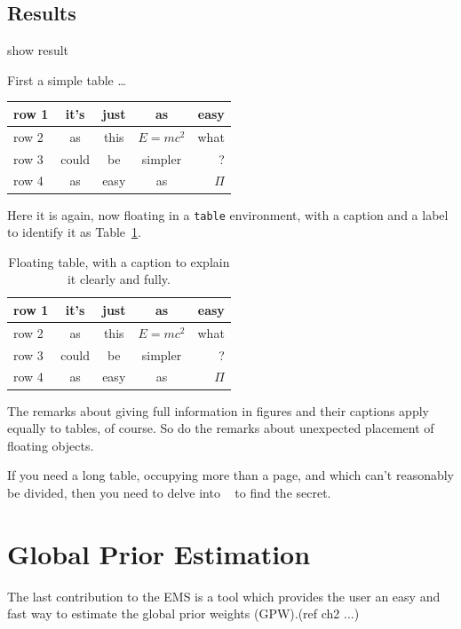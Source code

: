 \subsection{Results}
show result
\par
First a simple table \dots\par
\begin{center}
 \begin{tabular}{|l||c|c|c|r|}
    \hline
    row 1& it's & just & as & easy \\ \hline
    row 2& as & this & \(E=mc^2\) & what \\ \hline
    row 3& could & be & simpler & ? \\ \hline
    row 4& as & easy & as & \(\Pi\) \\ \hline
  \end{tabular}
\end{center}
\par
Here it is again, now floating in a \texttt{table} environment, with
a caption and a label to identify it as Table~\ref{table:one}.
\begin{table}[h]
  \centering
\begin{tabular}{|l||c|c|c|r|}
    \hline
    row 1& it's & just & as & easy \\ \hline
    row 2& as & this & \(E=mc^2\) & what \\ \hline
    row 3& could & be & simpler & ? \\ \hline
    row 4& as & easy & as & \(\Pi\) \\ \hline
  \end{tabular}
  \caption{Floating table, with a caption to explain it 
clearly and fully.}\label{table:one}
\end{table}
The remarks about giving full information in figures and their
captions apply equally to tables, of course. So do the remarks about
unexpected placement of floating objects.
\par
If you need a long table, occupying more than a page, and which
can't reasonably be divided, then you need to delve into \comp\
\cite[Chap~5]{MG} to find the secret.
\section{Global Prior Estimation}

The last contribution to the EMS is a tool which provides the user an easy and fast way to estimate the global prior weights (GPW).(ref ch2 ...)

